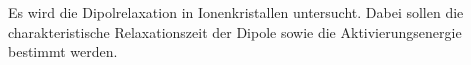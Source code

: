 Es wird die Dipolrelaxation in Ionenkristallen untersucht. Dabei sollen die charakteristische
Relaxationszeit der Dipole sowie die Aktivierungsenergie bestimmt werden.

